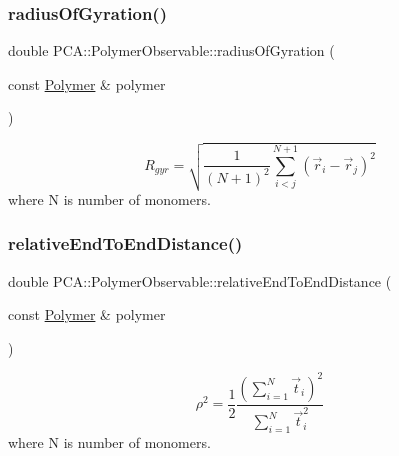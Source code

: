\subsubsection{\texorpdfstring{radius\+Of\+Gyration()}{radiusOfGyration()}}
{\footnotesize\ttfamily double P\+C\+A\+::\+Polymer\+Observable\+::radius\+Of\+Gyration (\begin{DoxyParamCaption}\item[{const \hyperlink{class_p_c_a_1_1_polymer}{Polymer} \&}]{polymer }\end{DoxyParamCaption})\hspace{0.3cm}{\ttfamily [static]}}





\[ R_{gyr} = \sqrt{\frac{1}{(N+1)^2} \sum_{i<j}^{N+1} \left( \vec{r}_i-\vec{r}_j \right)^2} \] where N is number of monomers. \hypertarget{class_p_c_a_1_1_polymer_observable_a72ff49d3aed6660b0bd7a8175f3b436e}{}\label{class_p_c_a_1_1_polymer_observable_a72ff49d3aed6660b0bd7a8175f3b436e} 
\subsubsection{\texorpdfstring{relative\+End\+To\+End\+Distance()}{relativeEndToEndDistance()}}
{\footnotesize\ttfamily double P\+C\+A\+::\+Polymer\+Observable\+::relative\+End\+To\+End\+Distance (\begin{DoxyParamCaption}\item[{const \hyperlink{class_p_c_a_1_1_polymer}{Polymer} \&}]{polymer }\end{DoxyParamCaption})\hspace{0.3cm}{\ttfamily [static]}}





\[ \rho^2 = \frac{1}{2} \frac{\left(\sum_{i=1}^N \vec{t}_i\right)^2} {\sum_{i=1}^N \vec{t}_i^2} \] where N is number of monomers. \hypertarget{class_p_c_a_1_1_polymer_observable_ae5b2dbf1d87aa54347f2a66bfb24e78b}{}\label{class_p_c_a_1_1_polymer_observable_ae5b2dbf1d87aa54347f2a66bfb24e78b} 
